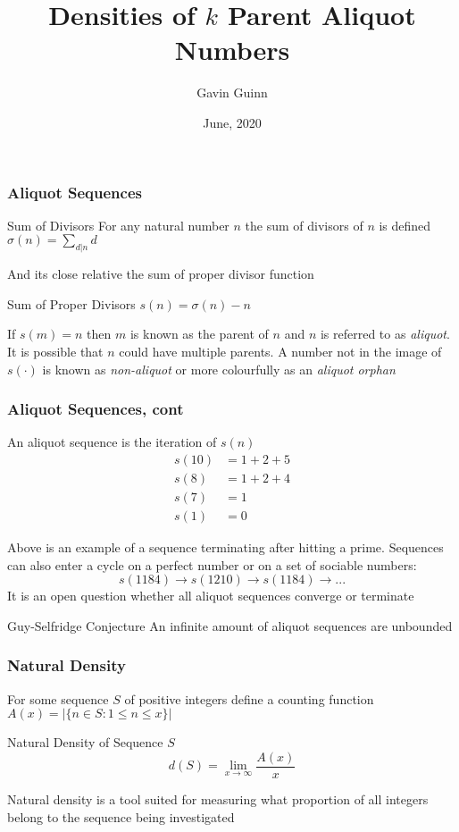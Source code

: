 \documentclass{beamer}
\title{Densities of $k$ Parent Aliquot Numbers}
\author{Gavin Guinn}
\institute{University of Calgary}
\date{June, 2020}
\begin{document}
\frame{\titlepage}


\begin{frame}
\frametitle{Aliquot Sequences}

\begin{block}{Sum of Divisors}
For any natural number $n$ the sum of divisors of $n$ is defined
$\sigma(n) = \sum_{d|n} d$
\end{block}

And its close relative the sum of proper divisor function
\begin{block}{Sum of Proper Divisors}
$s(n) = \sigma(n) - n$
\end{block}
If $s(m) = n$ then $m$ is known as the parent of $n$ and $n$ is referred to as \textit{aliquot}. It is possible that $n$ could have multiple parents.  \linebreak \linebreak
A number not in the image of $s(\cdot)$ is known as \textit{non-aliquot} or more colourfully as an \textit{aliquot orphan}
\end{frame}

\begin{frame}
\frametitle{Aliquot Sequences, cont}
An aliquot sequence is the iteration of $s(n)$
\begin{align*}
    s(10) &= 1 + 2 + 5\\  
    s(8) &= 1 + 2 + 4\\
    s(7) &= 1\\
    s(1) &= 0
\end{align*}

Above is an example of a sequence terminating after hitting a prime. Sequences can also enter a cycle on a perfect number or on a set of sociable numbers:
$$s(1184) \to s(1210) \to s(1184) \to ...$$
It is an open question whether all aliquot sequences converge or terminate
\begin{block}{Guy-Selfridge Conjecture}
    An infinite amount of aliquot sequences are unbounded 
\end{block}
\end{frame}

\begin{frame}
\frametitle{Natural Density}
For some sequence $S$ of positive integers define a counting function $A(x) = |\{n \in S : 1 \leq n \leq x\}|$ 
\begin{block}{Natural Density of Sequence $S$}
$$d(S)=\lim_{x\to\infty} \frac{A(x)}{x}$$
\end{block}
Natural density is a tool suited for measuring what proportion of all integers belong to the sequence being investigated
\end{frame}
\end{document}
